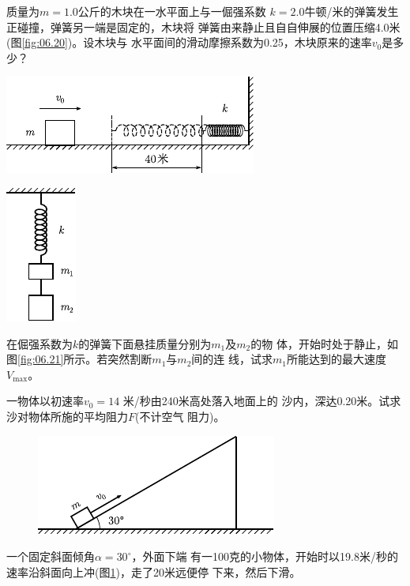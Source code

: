 \begin{exercises}
\exercise 质量为$ m = 1.0 $公斤的木块在一水平面上与一倔强系数
$ k = 2.0 $牛顿/米的弹簧发生正碰撞，弹簧另一端是固定的，木块将
弹簧由来静止且自自伸展的位置压缩4.0米(图\ref{fig:06.20})。设木块与
水平面间的滑动摩擦系数为0.25，木块原来的速率$ v _ { 0 } $是多少？
\begin{figurex}
    \begin{minipage}[b]{0.7\linewidth}
        \centering
        \includegraphics{figure/fig06.20}
        \caption{}
        \label{fig:06.20}
    \end{minipage}
    \hfill
    \begin{minipage}[b]{0.25\linewidth}
        \centering
        \includegraphics{figure/fig06.21}
        \caption{}
        \label{fig:06.21}
    \end{minipage}
\end{figurex}

\exercise 在倔强系数为$ k $的弹簧下面悬挂质量分别为$ m_1 $及$ m_2 $的物
体，开始时处于静止，如图\ref{fig:06.21}\;所示。若突然割断$ m _ { 1 } $与$ m_2 $间的连
线，试求$ m _ { 1 } $所能达到的最大速度$ V_{\max} $。

\exercise 一物体以初速率$ v _ { 0 } = 14 $ 米/秒由240米高处落入地面上的
沙内，深达0.20米。试求沙对物体所施的平均阻力$ F $(不计空气
阻力)。

\begin{figure}
    \centering
    \includegraphics{figure/fig06.22}
    \caption{}
    \label{fig:06.22}
\end{figure}
\exercise 一个固定斜面倾角$ \alpha = 30 ^ { \circ } $，外面下端
有一100克的小物体，开始时以19.8米/秒的
速率沿斜面向上冲(图\ref{fig:06.22})，走了20米远便停
下来，然后下滑。


\end{exercises}

